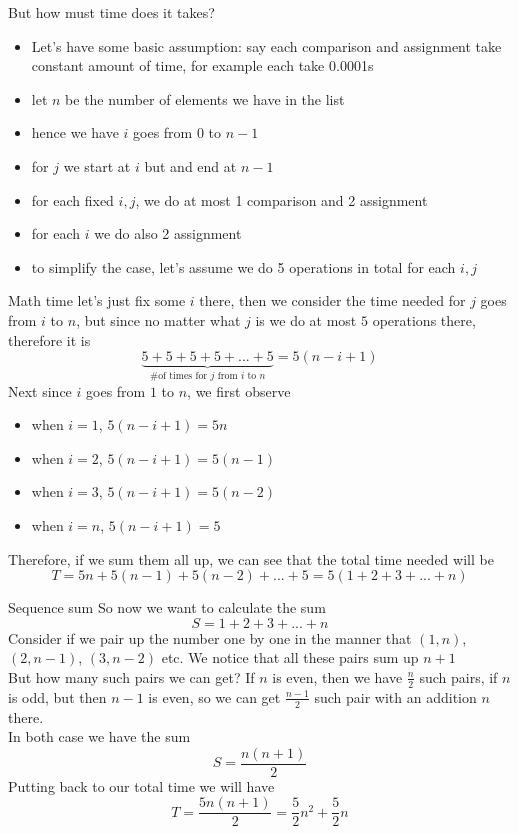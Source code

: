 \documentclass[10pt,xcolor={table,dvipsnames},t]{beamer}
\begin{document}
\begin{frame}{But how must time does it takes?}
  \begin{itemize}
    \item Let's have some basic assumption: say each comparison and assignment take constant amount of time, for example each take 0.0001s
    \item let $n$ be the number of elements we have in the list
    \item hence we have $i$ goes from $0$ to $n-1$
    \item for $j$ we start at $i$ but and end at $n-1$
    \item for each fixed $i,j$, we do at most 1 comparison and 2 assignment
    \item for each $i$ we do also 2 assignment
    \item to simplify the case, let's assume we do 5 operations in total for each $i,j$
  \end{itemize}
\end{frame}

\begin{frame}{Math time}
let's just fix some $i$ there, then we consider the time needed for $j$ goes from $i$ to $n$, but since no matter what $j$ is we do at most $5$ operations there, therefore it is
$$\underbrace{5+5+5+5+...+5}_{\text{\# of times for $j$ from $i$ to $n$}}=5(n-i+1)$$
Next since $i$ goes from $1$ to $n$, we first observe
\begin{itemize}
  \item when $i=1$, $5(n-i+1)=5n$
  \item when $i=2$, $5(n-i+1)=5(n-1)$
  \item when $i=3$, $5(n-i+1)=5(n-2)$
  \item when $i=n$, $5(n-i+1)=5$
\end{itemize}
Therefore, if we sum them all up, we can see that the total time needed will be 
$$T=5n+5(n-1)+5(n-2)+...+5=5(1+2+3+...+n)$$
\end{frame}

\begin{frame}{Sequence sum}
So now we want to calculate the sum
$$S=1+2+3+...+n$$
Consider if we pair up the number one by one in the manner that $(1,n)$, $(2,n-1)$, $(3,n-2)$ etc. We notice that all these pairs sum up $n+1$\\
But how many such pairs we can get? If $n$ is even, then we have $\frac{n}{2}$ such pairs, if $n$ is odd, but then $n-1$ is even, so we can get $\frac{n-1}{2}$ such pair with an addition $n$ there.\\
In both case we have the sum
$$S=\frac{n(n+1)}{2}$$
Putting back to our total time we will have
$$T=\frac{5n(n+1)}{2}=\frac{5}{2}n^{2}+\frac{5}{2}n$$
\end{frame}
\end{document}
